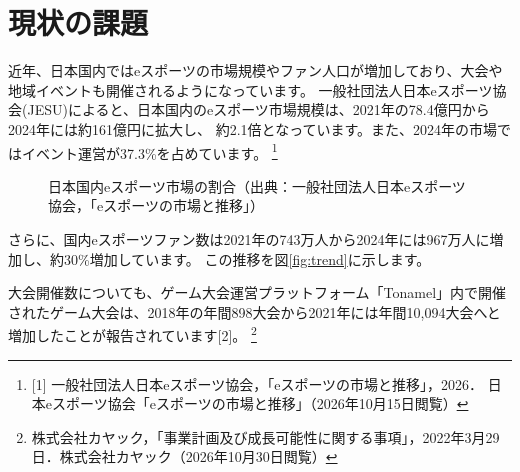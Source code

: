 \section{現状の課題}

近年、日本国内ではeスポーツの市場規模やファン人口が増加しており、大会や地域イベントも開催されるようになっています。
一般社団法人日本eスポーツ協会(JESU)によると、日本国内のeスポーツ市場規模は、2021年の78.4億円から2024年には約161億円に拡大し、
約2.1倍となっています。また、2024年の市場ではイベント運営が37.3\%を占めています。\cite{jeSU2026} 
\footnote{[1] 一般社団法人日本eスポーツ協会，「eスポーツの市場と推移」，2026． 
 日本eスポーツ協会「eスポーツの市場と推移」（2026年10月15日閲覧）}

\begin{figure}[H]
  \centering
  \makeatletter
  \def\pgfpie@numbertext#1{%
    \pgfpie@ifhidenumber{}{%
      \ifdim #1pt<1pt
      \else
        \pgfpie@beforenumber#1\pgfpie@afternumber
      \fi
    }%
  }
  \makeatother
  \caption{日本国内eスポーツ市場の割合（出典：一般社団法人日本eスポーツ協会，「eスポーツの市場と推移」）}
  \label{fig:revenue}
\end{figure}


さらに、国内eスポーツファン数は2021年の743万人から2024年には967万人に増加し、約30\%増加しています。
この推移を図\ref{fig:trend}に示します。

大会開催数についても、ゲーム大会運営プラットフォーム「Tonamel」内で開催されたゲーム大会は、2018年の年間898大会から2021年には年間10,094大会へと増加したことが報告されています[2]。
\footnote[2]{株式会社カヤック，「事業計画及び成長可能性に関する事項」，2022年3月29日．株式会社カヤック（2026年10月30日閲覧）}



% 

